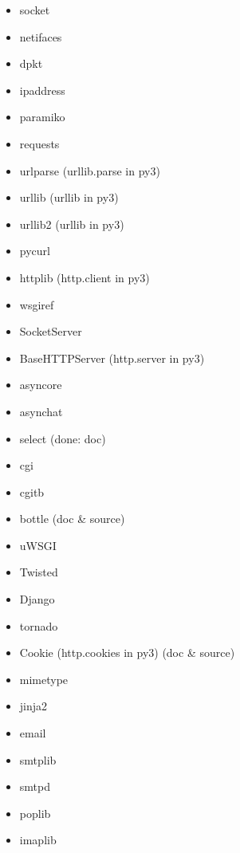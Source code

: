 \documentclass{article}
\begin{document}
\begin{enumerate}
\begin{itemize}
            \item socket
            \item netifaces
            \item dpkt
            \item ipaddress
            \item paramiko
            \item requests
            \item urlparse (urllib.parse in py3)
            \item urllib (urllib in py3)
            \item urllib2 (urllib in py3)
            \item pycurl
            \item httplib (http.client in py3)
            \item wsgiref
            \item SocketServer
            \item BaseHTTPServer (http.server in py3)
            \item asyncore
            \item asynchat
            \item select (done: doc)
            \item cgi
            \item cgitb
            \item bottle (doc & source)
            \item uWSGI
            \item Twisted
            \item Django
            \item tornado
            \item Cookie (http.cookies in py3) (doc & source)

            \item mimetype

            \item jinja2

            \item email
            \item smtplib
            \item smtpd
            \item poplib
            \item imaplib


\end{itemize}
\end{enumerate}
\end{document}
